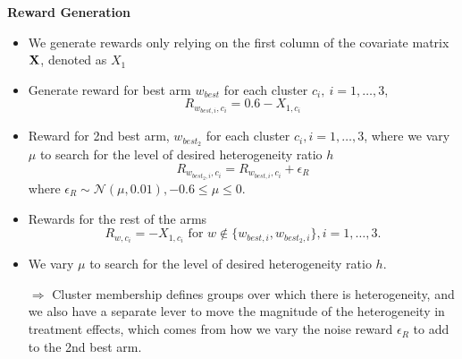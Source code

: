 \documentclass[letterpaper, 12pt, parskip=full,]{scrartcl}
\begin{document}
\textbf{Reward Generation}
\begin{itemize}
   \item We generate rewards only relying on the first column of the covariate matrix $\mathbf{X}$, denoted as $X_1$
    \item Generate reward for best arm $w_{best}$ for each cluster $c_i,  \ i = 1, \dots, 3$, \[R_{w_{best, i}, c_i} = 0.6 - X_{1, c_i}\]
    \item Reward for 2nd best arm, $w_{best_2}$ for each cluster $c_i,  i = 1, \dots, 3$, where we vary $\mu$ to search for the level of desired heterogeneity ratio $h$
    $$R_{w_{best_2, i}, c_i} = R_{w_{best, i}, c_i} + \epsilon_R $$ where $\epsilon_R \sim \mathcal{N}(\mu, 0.01), -0.6 \le \mu \le 0$. 
    \item Rewards for the rest of the arms
    $$R_{w, c_i} = -X_{1, c_i} \mbox{ for }  w \not\in \{w_{best, i}, w_{best_2, i}\}, i = 1, \dots, 3.$$
    \item We vary $\mu$ to search for the level of desired heterogeneity ratio $h$.
        \item[$\Rightarrow$] Cluster membership defines groups over which there is heterogeneity, and we also have a separate lever to move the magnitude of the heterogeneity in treatment effects, which comes from how we vary the noise reward $\epsilon_R$ to add to the 2nd best arm. 
\end{itemize}
\end{document}
